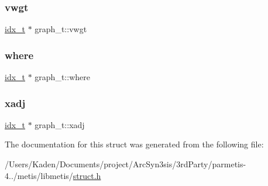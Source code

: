 \mbox{\label{a00734_a3a94894dcbf1b65a638e37cd485b5f88}} 
\subsubsection{\texorpdfstring{vwgt}{vwgt}}
{\footnotesize\ttfamily \hyperlink{a00876_aaa5262be3e700770163401acb0150f52}{idx\+\_\+t} $\ast$ graph\+\_\+t\+::vwgt}

\mbox{\label{a00734_a23aa949251b3cff3f23ba5db34d6a7d5}} 
\subsubsection{\texorpdfstring{where}{where}}
{\footnotesize\ttfamily \hyperlink{a00876_aaa5262be3e700770163401acb0150f52}{idx\+\_\+t} $\ast$ graph\+\_\+t\+::where}

\mbox{\label{a00734_aa92b073425f4bca4789af4cf33a547e5}} 
\subsubsection{\texorpdfstring{xadj}{xadj}}
{\footnotesize\ttfamily \hyperlink{a00876_aaa5262be3e700770163401acb0150f52}{idx\+\_\+t} $\ast$ graph\+\_\+t\+::xadj}



The documentation for this struct was generated from the following file\+:\begin{DoxyCompactItemize}
\item 
/\+Users/\+Kaden/\+Documents/project/\+Arc\+Syn3sis/3rd\+Party/parmetis-\/4../metis/libmetis/\hyperlink{a00972}{struct.\+h}\end{DoxyCompactItemize}
